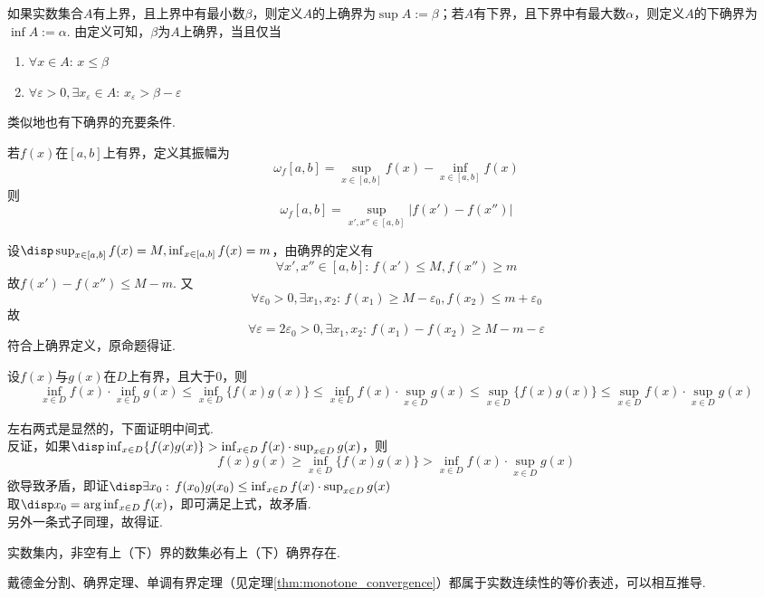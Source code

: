 \begin{definition}[确界]
如果实数集合$A$有上界，且上界中有最小数$\beta$，则定义$A$的上确界为$\sup A:=\beta$；若$A$有下界，且下界中有最大数$\alpha$，则定义$A$的下确界为$\inf A:=\alpha$.
由定义可知，$\beta$为$A$上确界，当且仅当
\begin{enumerate}
	\item $\forall x\in A:\,x\leq\beta$
	\item $\forall\varepsilon>0,\exists x_\varepsilon\in A:\,x_\varepsilon >\beta-\varepsilon$
\end{enumerate}
\par 类似地也有下确界的充要条件.
\begin{example}
若$f(x)$在$[a,b]$上有界，定义其振幅为
\[\omega_f[a,b]=\sup_{x\in[a,b]}f(x)-\inf_{x\in[a,b]}f(x)\]
则
\[\omega_f[a,b]=\sup_{x',x''\in[a,b]}|f(x')-f(x'')|\]
\end{example}
\begin{analysis}
设$\disp\sup_{x\in[a,b]}f(x)=M,\inf_{x\in[a,b]}f(x)=m$，由确界的定义有
\[\forall x',x''\in[a,b]:\,f(x')\leq M,f(x'')\geq m\]
故$f(x')-f(x'')\leq M-m$. 又
\[\forall\varepsilon_0>0,\exists x_1,x_2:\,f(x_1)\geq M-\varepsilon_0,f(x_2)\leq m+\varepsilon_0\]
故
\[\forall\varepsilon=2\varepsilon_0>0,\exists x_1,x_2:\,f(x_1)-f(x_2)\geq M-m-\varepsilon\]
符合上确界定义，原命题得证.
\end{analysis}
\begin{example}
\label{ex:inf_sup_inequality}
设$f(x)$与$g(x)$在$D$上有界，且大于$0$，则
\[\inf_{x\in D}f(x)\cdot\inf_{x\in D}g(x)\leq\inf_{x\in D}\{f(x)g(x)\}\leq\inf_{x\in D}f(x)\cdot\sup_{x\in D}g(x)\leq\sup_{x\in D}\{f(x)g(x)\}\leq\sup_{x\in D}f(x)\cdot\sup_{x\in D}g(x)\]
\end{example}
\begin{analysis}
左右两式是显然的，下面证明中间式.\\
反证，如果$\disp\inf_{x\in D}\{f(x)g(x)\}>\inf_{x\in D}f(x)\cdot\sup_{x\in D}g(x)$，则
\[f(x)g(x)\geq\inf_{x\in D}\{f(x)g(x)\}>\inf_{x\in D}f(x)\cdot\sup_{x\in D}g(x)\]
欲导致矛盾，即证$\disp\exists x_0:\,f(x_0)g(x_0)\leq \inf_{x\in D}f(x)\cdot\sup_{x\in D}g(x)$\\
取$\disp x_0=\arg\inf_{x\in D}f(x)$，即可满足上式，故矛盾.\\
另外一条式子同理，故得证.
\end{analysis}
\end{definition}
\begin{theorem}[确界定理]
实数集内，非空有上（下）界的数集必有上（下）确界存在.
\end{theorem}
\par 戴德金分割、确界定理、单调有界定理（见定理\ref{thm:monotone_convergence}）都属于实数连续性的等价表述，可以相互推导.

